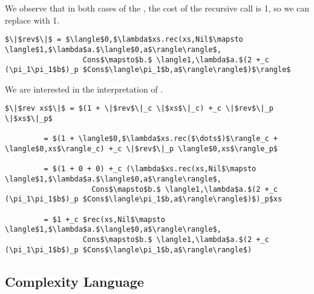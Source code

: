 We observe that in both cases of the , the cost of the recursive call is 1, so we can replace  with 1.
%
\begin{lstlisting}
$\|$rev$\|$ = $\langle$0,$\lambda$xs.rec(xs,Nil$\mapsto \langle$1,$\lambda$a.$\langle$0,a$\rangle\rangle$,
                  Cons$\mapsto$b.$ \langle1,\lambda$a.$(2 +_c (\pi_1\pi_1$b$)_p $Cons$\langle\pi_1$b,a$\rangle\rangle$)$\rangle$
\end{lstlisting}
%
We are interested in the interpretation of .
%
\begin{lstlisting}
$\|$rev xs$\|$ = $(1 + \|$rev$\|_c \|$xs$\|_c) +_c \|$rev$\|_p \|$xs$\|_p$

         = $(1 + \langle$0,$\lambda$xs.rec($\dots$)$\rangle_c + \langle$0,xs$\rangle_c) +_c \|$rev$\|_p \langle$0,xs$\rangle_p$

         = $(1 + 0 + 0) +_c (\lambda$xs.rec(xs,Nil$\mapsto \langle$1,$\lambda$a.$\langle$0,a$\rangle\rangle$,
                    Cons$\mapsto$b.$ \langle1,\lambda$a.$(2 +_c (\pi_1\pi_1$b$)_p $Cons$\langle\pi_1$b,a$\rangle\rangle$)$)_p$xs

         = $1 +_c $rec(xs,Nil$\mapsto \langle$1,$\lambda$a.$\langle$0,a$\rangle\rangle$,
                  Cons$\mapsto$b.$ \langle1,\lambda$a.$(2 +_c (\pi_1\pi_1$b$)_p $Cons$\langle\pi_1$b,a$\rangle\rangle$)
\end{lstlisting}
%

\subsection*{Complexity Language}
